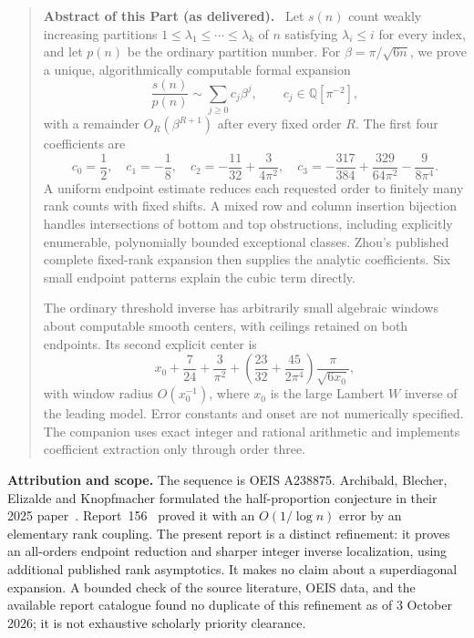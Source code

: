 \documentclass[11pt,letterpaper]{article}
\numberwithin{equation}{section}
\theoremstyle{remark}\newtheorem{remark}[theorem]{Remark}
\newcommand{\QQ}{\mathbb Q}
\newenvironment{partabstract}{\begin{quote}\small\noindent\textbf{Abstract of this Part (as delivered).}\ }{\end{quote}}
\begin{document}
\begin{partabstract}
Let $s(n)$ count weakly increasing partitions
$1\leq\lambda_1\leq\cdots\leq\lambda_k$ of $n$ satisfying
$\lambda_i\leq i$ for every index, and let $p(n)$ be the ordinary
partition number. For $\beta=\pi/\sqrt{6n}$, we prove a unique,
algorithmically computable formal expansion
\[
 \frac{s(n)}{p(n)}\sim\sum_{j\geq0}c_j\beta^j,
 \qquad c_j\in\QQ[\pi^{-2}],
\]
with a remainder $O_R(\beta^{R+1})$ after every fixed order $R$.
The first four coefficients are
\[
 c_0=\frac12,\quad c_1=-\frac18,\quad
 c_2=-\frac{11}{32}+\frac{3}{4\pi^2},\quad
 c_3=-\frac{317}{384}+\frac{329}{64\pi^2}-\frac9{8\pi^4}.
\]
A uniform endpoint estimate reduces each requested order to finitely
many rank counts with fixed shifts. A mixed row and column insertion
bijection handles intersections of bottom and top obstructions,
including explicitly enumerable, polynomially bounded exceptional
classes. Zhou's published complete fixed-rank expansion then supplies
the analytic coefficients. Six small endpoint patterns explain the
cubic term directly.

The ordinary threshold inverse has arbitrarily small algebraic
windows about computable smooth centers, with ceilings retained on
both endpoints. Its second explicit center is
\[
 x_0+\frac7{24}+\frac3{\pi^2}
 +\left(\frac{23}{32}+\frac{45}{2\pi^4}\right)
       \frac{\pi}{\sqrt{6x_0}},
\]
with window radius $O(x_0^{-1})$, where $x_0$ is the large Lambert
$W$ inverse of the leading model. Error constants and onset are not
numerically specified. The companion uses exact integer and rational
arithmetic and implements coefficient extraction only through order
three.
\end{partabstract}
\noindent\textbf{Attribution and scope.}
The sequence is OEIS A238875. Archibald, Blecher, Elizalde and
Knopfmacher formulated the half-proportion conjecture in their 2025
paper~\cite{abek}. Report~156~\cite{r156} proved it with an
$O(1/\log n)$ error by an elementary rank coupling. The present report
is a distinct refinement: it proves an all-orders endpoint reduction
and sharper integer inverse localization, using additional published
rank asymptotics. It makes no claim about a superdiagonal expansion.
A bounded check of the source literature, OEIS data, and the available
report catalogue found no duplicate of this refinement as of
3 October 2026; it is not exhaustive scholarly priority clearance.
\medskip
\end{document}
